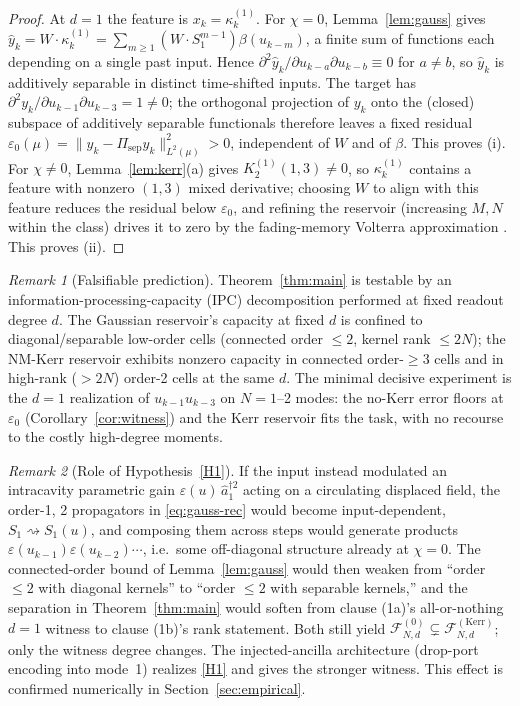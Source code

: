\documentclass[11pt]{article}
\theoremstyle{remark}
\newtheorem{remark}{Remark}
\newcommand{\ahat}{\hat{a}}
\newcommand{\Fclass}[2]{\mathcal{F}^{(#1)}_{#2}}
\newcommand{\Kerr}{\mathrm{Kerr}}
\begin{document}
\begin{proof}
At $d=1$ the feature is $x_k=\kappa^{(1)}_k$. For $\chi=0$, Lemma~\ref{lem:gauss}
gives $\hat y_k=W\cdot\kappa^{(1)}_k=\sum_{m\ge1}(W\cdot S_1^{m-1})\beta(u_{k-m})$,
a finite sum of functions each depending on a single past input. Hence
$\partial^2\hat y_k/\partial u_{k-a}\partial u_{k-b}\equiv0$ for $a\neq b$, so
$\hat y_k$ is additively separable in distinct time-shifted inputs. The target has
$\partial^2 y_k/\partial u_{k-1}\partial u_{k-3}=1\neq0$; the orthogonal
projection of $y_k$ onto the (closed) subspace of additively separable functionals
therefore leaves a fixed residual
$\varepsilon_0(\mu)=\|y_k-\Pi_{\mathrm{sep}}y_k\|^2_{L^2(\mu)}>0$, independent of
$W$ and of $\beta$. This proves (i). For $\chi\neq0$, Lemma~\ref{lem:kerr}(a) gives
$K^{(1)}_2(1,3)\neq0$, so $\kappa^{(1)}_k$ contains a feature with nonzero $(1,3)$
mixed derivative; choosing $W$ to align with this feature reduces the residual
below $\varepsilon_0$, and refining the reservoir (increasing $M,N$ within the
class) drives it to zero by the fading-memory Volterra approximation
\cite{boyd1985,cuchiero2021,nokkala2021}. This proves (ii).
\end{proof}

\begin{remark}[Falsifiable prediction]\label{rem:ipc}
Theorem~\ref{thm:main} is testable by an information-processing-capacity (IPC)
decomposition performed at fixed readout degree $d$. The Gaussian reservoir's
capacity at fixed $d$ is confined to diagonal/separable low-order cells (connected
order $\le2$, kernel rank $\le2N$); the NM-Kerr reservoir exhibits nonzero
capacity in connected order-$\ge3$ cells and in high-rank ($>2N$) order-2 cells at
the same $d$. The minimal decisive experiment is the $d=1$ realization of
$u_{k-1}u_{k-3}$ on $N=1$--2 modes: the no-Kerr error floors at $\varepsilon_0$
(Corollary~\ref{cor:witness}) and the Kerr reservoir fits the task, with no
recourse to the costly high-degree moments.
\end{remark}

\begin{remark}[Role of Hypothesis~\ref{H1}]\label{rem:H1}
If the input instead modulated an intracavity parametric gain
$\varepsilon(u)\,\ahat_1^{\dagger2}$ acting on a circulating displaced field, the
order-1, 2 propagators in \eqref{eq:gauss-rec} would become input-dependent,
$S_1\rightsquigarrow S_1(u)$, and composing them across steps would generate
products $\varepsilon(u_{k-1})\varepsilon(u_{k-2})\cdots$, i.e.\ some off-diagonal
structure already at $\chi=0$. The connected-order bound of Lemma~\ref{lem:gauss}
would then weaken from ``order $\le2$ with diagonal kernels'' to ``order $\le2$
with separable kernels,'' and the separation in Theorem~\ref{thm:main} would
soften from clause (1a)'s all-or-nothing $d=1$ witness to clause (1b)'s rank
statement. Both still yield $\Fclass{0}{N,d}\subsetneq\Fclass{\Kerr}{N,d}$; only
the witness degree changes. The injected-ancilla architecture (drop-port encoding
into mode~1) realizes \ref{H1} and gives the stronger witness. This effect is
confirmed numerically in Section~\ref{sec:empirical}.
\end{remark}
\end{document}
